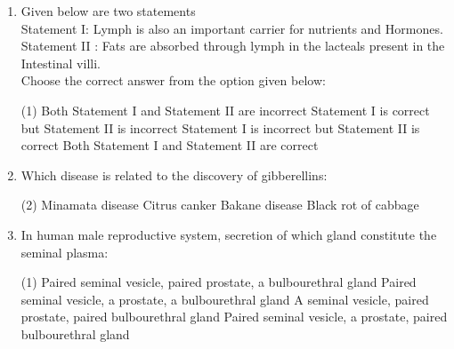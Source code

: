 \documentclass[twocolumn]{article}
\begin{document}
\begin{enumerate}
    Statement I: The mammary glands of the female undergo differentiation during pregnancy and starts producing milk towards the end of pregnancy by the process called lactation.\\
    Statement II : The milk produced during the initial few days of lactation is called colostrum.\\
    Choose the correct answer from the option given below:
        \begin{tasks}(1)
            \task Both Statement I and Statement II are incorrect
            \task Statement I is correct but Statement II is incorrect
            \task Statement I is incorrect but Statement II is correct
            \task Both Statement I and Statement II are correct
        \end{tasks}
    \item Given below are two statements\\
    Statement I: Lymph is also an important carrier for nutrients and Hormones.\\
    Statement II : Fats are absorbed through lymph in the lacteals present in the Intestinal villi.\\
    Choose the correct answer from the option given below:

    \begin{tasks}(1)
        \task Both Statement I and Statement II are incorrect
        \task Statement I is correct but Statement II is incorrect
        \task Statement I is incorrect but Statement II is correct
        \task Both Statement I and Statement II are correct
    \end{tasks}
    
    
   
  

    \item Which disease is related to the discovery of gibberellins:
    \begin{tasks}(2)
        \task Minamata disease
        \task Citrus canker
        \task Bakane disease
        \task Black rot of cabbage
    \end{tasks}

    \item In human male reproductive system, secretion of which gland constitute the seminal plasma:
    \begin{tasks}(1)
        \task Paired seminal vesicle, paired prostate, a bulbourethral gland
        \task Paired seminal vesicle, a prostate, a bulbourethral gland
        \task A seminal vesicle, paired prostate, paired bulbourethral gland
        \task Paired seminal vesicle, a prostate, paired bulbourethral gland
    \end{tasks}


\end{enumerate}
\end{document}
